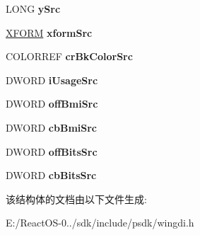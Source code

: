 \begin{DoxyCompactItemize}
L\+O\+NG {\bfseries y\+Src}
\item 
\mbox{\label{structtag_e_m_r_b_i_t_b_l_t_a2c27ad13271d625a7b5155f5049a6574}} 
\hyperlink{struct___x_f_o_r_m}{X\+F\+O\+RM} {\bfseries xform\+Src}
\item 
\mbox{\label{structtag_e_m_r_b_i_t_b_l_t_a5bac9ea927d286cc2967534cd5d59969}} 
C\+O\+L\+O\+R\+R\+EF {\bfseries cr\+Bk\+Color\+Src}
\item 
\mbox{\label{structtag_e_m_r_b_i_t_b_l_t_aa4f1f5ef3d0766f674f861aad8f35aa8}} 
D\+W\+O\+RD {\bfseries i\+Usage\+Src}
\item 
\mbox{\label{structtag_e_m_r_b_i_t_b_l_t_abb40378f2cd2652202d893195410bd58}} 
D\+W\+O\+RD {\bfseries off\+Bmi\+Src}
\item 
\mbox{\label{structtag_e_m_r_b_i_t_b_l_t_ae87e4c3695d95756d31cf15a6a438471}} 
D\+W\+O\+RD {\bfseries cb\+Bmi\+Src}
\item 
\mbox{\label{structtag_e_m_r_b_i_t_b_l_t_a74deb4d59413fe3e9e9e8188ed42ea2d}} 
D\+W\+O\+RD {\bfseries off\+Bits\+Src}
\item 
\mbox{\label{structtag_e_m_r_b_i_t_b_l_t_a3f6492998a9d5b04ba495d45a8f4e1da}} 
D\+W\+O\+RD {\bfseries cb\+Bits\+Src}
\end{DoxyCompactItemize}


该结构体的文档由以下文件生成\+:\begin{DoxyCompactItemize}
\item 
E\+:/\+React\+O\+S-\/0../sdk/include/psdk/wingdi.\+h\end{DoxyCompactItemize}

